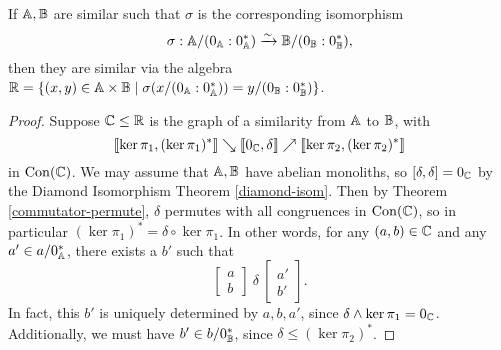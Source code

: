 \documentclass[letterpaper,11pt]{article}
\DeclareMathOperator{\Con}{Con}
\begin{document}
\begin{prop} If $\mathbb{A}, \mathbb{B}$ are similar such that $\sigma$ is the corresponding isomorphism
\[
\sigma: \mathbb{A}/(0_{\mathbb{A}}:0_{\mathbb{A}}^*) \xrightarrow{\sim} \mathbb{B}/(0_{\mathbb{B}}:0_{\mathbb{B}}^*),
\]
then they are similar via the algebra $\mathbb{R} = \{(x,y) \in \mathbb{A} \times \mathbb{B} \mid \sigma(x/(0_{\mathbb{A}}:0_{\mathbb{A}}^*)) = y/(0_{\mathbb{B}}:0_{\mathbb{B}}^*)\}$.
\end{prop}
\begin{proof} Suppose $\mathbb{C} \le \mathbb{R}$ is the graph of a similarity from $\mathbb{A}$ to $\mathbb{B}$, with
\[
\llbracket \ker \pi_1, (\ker \pi_1)^* \rrbracket \searrow \llbracket 0_{\mathbb{C}}, \delta \rrbracket \nearrow \llbracket \ker \pi_2, (\ker \pi_2)^* \rrbracket
\]
in $\Con(\bC)$. We may assume that $\mathbb{A}, \mathbb{B}$ have abelian monoliths, so $[\delta,\delta] = 0_{\mathbb{C}}$ by the Diamond Isomorphism Theorem \ref{diamond-isom}. Then by Theorem \ref{commutator-permute}, $\delta$ permutes with all congruences in $\Con(\bC)$, so in particular $(\ker \pi_1)^* = \delta \circ \ker \pi_1$. In other words, for any $(a,b) \in \mathbb{C}$ and any $a' \in a/0_{\mathbb{A}}^*$, there exists a $b'$ such that
\[
\begin{bmatrix} a\\ b\end{bmatrix}\ \delta\ \begin{bmatrix} a'\\ b'\end{bmatrix}.
\]
In fact, this $b'$ is uniquely determined by $a,b,a'$, since $\delta \wedge \ker \pi_1 = 0_{\mathbb{C}}$. Additionally, we must have $b' \in b/0_{\mathbb{B}}^*$, since $\delta \le (\ker \pi_2)^*$.


\end{proof}
\end{document}
